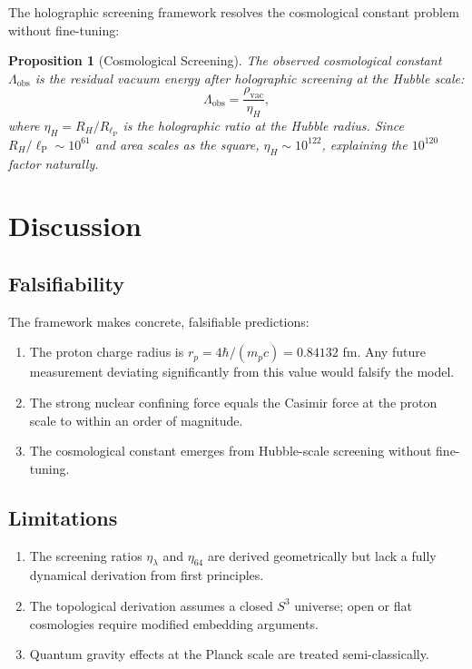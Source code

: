 \documentclass[12pt, a4paper]{article}
\theoremstyle{plain}
\newtheorem{proposition}[theorem]{Proposition}
\theoremstyle{definition}
\theoremstyle{remark}
\newcommand{\lP}{\ell_{\mathrm{P}}}
\newcommand{\rp}{r_p}
\begin{document}
The holographic screening framework resolves the cosmological constant
problem without fine-tuning:

\begin{proposition}[Cosmological Screening]\label{prop:cc}
  The observed cosmological constant $\Lambda_{\text{obs}}$ is the residual
  vacuum energy after holographic screening at the Hubble scale:
  \begin{equation}
    \Lambda_{\text{obs}} = \frac{\rho_{\text{vac}}}{\eta_H},
  \end{equation}
  where $\eta_H = R_H / R_{\lP}$ is the holographic ratio at the Hubble
  radius. Since $R_H / \lP \sim 10^{61}$ and area scales as the square,
  $\eta_H \sim 10^{122}$, explaining the $10^{120}$ factor naturally.
\end{proposition}

\section{Discussion}\label{sec:discussion}

\subsection{Falsifiability}

The framework makes concrete, falsifiable predictions:
\begin{enumerate}
  \item The proton charge radius is $\rp = 4\hbar/(m_p c) = 0.84132$ fm.
    Any future measurement deviating significantly from this value would
    falsify the model.
  \item The strong nuclear confining force equals the Casimir force at the
    proton scale to within an order of magnitude.
  \item The cosmological constant emerges from Hubble-scale screening
    without fine-tuning.
\end{enumerate}

\subsection{Limitations}

\begin{enumerate}
  \item The screening ratios $\eta_\lambda$ and $\eta_{64}$ are derived
    geometrically but lack a fully dynamical derivation from first principles.
  \item The topological derivation assumes a closed $S^3$ universe; open
    or flat cosmologies require modified embedding arguments.
  \item Quantum gravity effects at the Planck scale are treated
    semi-classically.
\end{enumerate}
\end{document}
